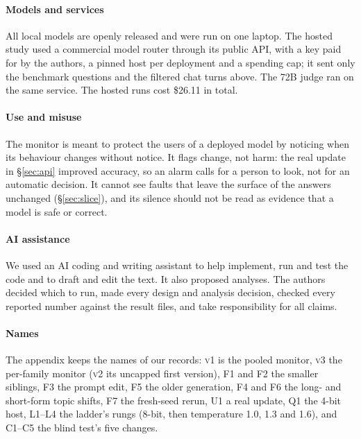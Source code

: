 \documentclass{article}
\newcommand{\vone}{\textsc{v1}}
\newcommand{\vtwo}{\textsc{v2}}
\newcommand{\vthree}{\textsc{v3}}
\begin{document}
\paragraph{Models and services} All local models are openly released and were run
on one laptop. The hosted study used a commercial model router through its public
API, with a key paid for by the authors, a pinned host per deployment and a spending
cap; it sent only the benchmark questions and the filtered chat turns above. The
72B judge ran on the same service. The hosted runs cost \$26.11 in total.

\paragraph{Use and misuse} The monitor is meant to protect the users of a deployed
model by noticing when its behaviour changes without notice. It flags change, not
harm: the real update in \S\ref{sec:api} improved accuracy, so an alarm calls for
a person to look, not for an automatic decision. It cannot see faults that leave
the surface of the answers unchanged (\S\ref{sec:slice}), and its silence should not
be read as evidence that a model is safe or correct.

\paragraph{AI assistance} We used an AI coding and writing assistant to help
implement, run and test the code and to draft and edit the text. It also proposed
analyses. The authors decided which to run, made every design and analysis
decision, checked every reported number against the result files, and take
responsibility for all claims.




\appendix

\paragraph{Names} The appendix keeps the names of our records: \vone{} is the
pooled monitor, \vthree{} the per-family monitor (\vtwo{} its uncapped first
version), F1 and F2 the smaller siblings, F3 the prompt edit, F5 the older
generation, F4 and F6 the long- and short-form topic shifts, F7 the fresh-seed
rerun, U1 a real update, Q1 the 4-bit host, L1--L4 the ladder's rungs (8-bit, then
temperature 1.0, 1.3 and 1.6), and C1--C5 the blind test's five changes.
\end{document}
